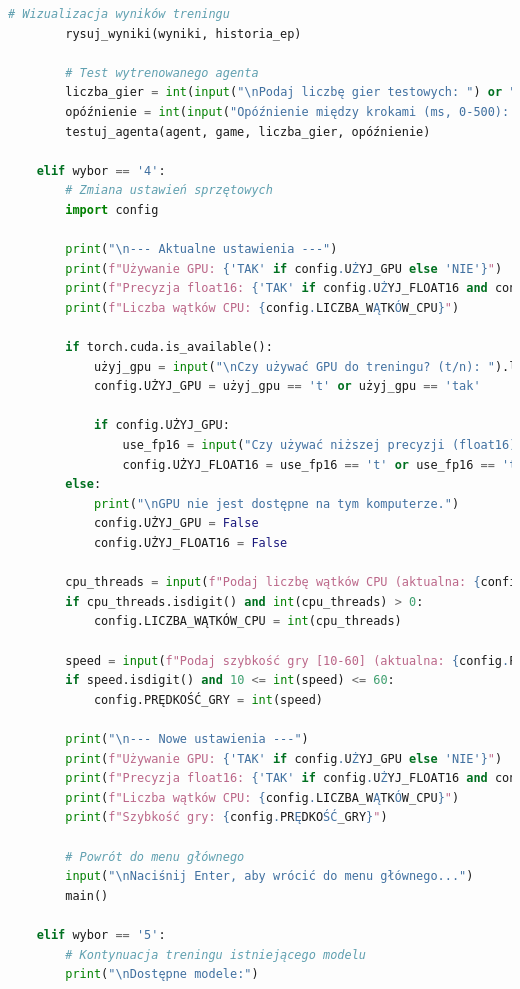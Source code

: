 \documentclass[a4paper,12pt]{article}
\begin{document}
\begin{lstlisting}[language=Python]
        # Wizualizacja wyników treningu
        rysuj_wyniki(wyniki, historia_ep)
        
        # Test wytrenowanego agenta
        liczba_gier = int(input("\nPodaj liczbę gier testowych: ") or "5")
        opóźnienie = int(input("Opóźnienie między krokami (ms, 0-500): ") or "100")
        testuj_agenta(agent, game, liczba_gier, opóźnienie)
    
    elif wybor == '4':
        # Zmiana ustawień sprzętowych
        import config
        
        print("\n--- Aktualne ustawienia ---")
        print(f"Używanie GPU: {'TAK' if config.UŻYJ_GPU else 'NIE'}")
        print(f"Precyzja float16: {'TAK' if config.UŻYJ_FLOAT16 and config.UŻYJ_GPU else 'NIE'}")
        print(f"Liczba wątków CPU: {config.LICZBA_WĄTKÓW_CPU}")
        
        if torch.cuda.is_available():
            użyj_gpu = input("\nCzy używać GPU do treningu? (t/n): ").lower()
            config.UŻYJ_GPU = użyj_gpu == 't' or użyj_gpu == 'tak'
            
            if config.UŻYJ_GPU:
                use_fp16 = input("Czy używać niższej precyzji (float16) dla szybszego treningu? (t/n): ").lower()
                config.UŻYJ_FLOAT16 = use_fp16 == 't' or use_fp16 == 'tak'
        else:
            print("\nGPU nie jest dostępne na tym komputerze.")
            config.UŻYJ_GPU = False
            config.UŻYJ_FLOAT16 = False
        
        cpu_threads = input(f"Podaj liczbę wątków CPU (aktualna: {config.LICZBA_WĄTKÓW_CPU}): ")
        if cpu_threads.isdigit() and int(cpu_threads) > 0:
            config.LICZBA_WĄTKÓW_CPU = int(cpu_threads)
        
        speed = input(f"Podaj szybkość gry [10-60] (aktualna: {config.PRĘDKOŚĆ_GRY}): ")
        if speed.isdigit() and 10 <= int(speed) <= 60:
            config.PRĘDKOŚĆ_GRY = int(speed)
        
        print("\n--- Nowe ustawienia ---")
        print(f"Używanie GPU: {'TAK' if config.UŻYJ_GPU else 'NIE'}")
        print(f"Precyzja float16: {'TAK' if config.UŻYJ_FLOAT16 and config.UŻYJ_GPU else 'NIE'}")
        print(f"Liczba wątków CPU: {config.LICZBA_WĄTKÓW_CPU}")
        print(f"Szybkość gry: {config.PRĘDKOŚĆ_GRY}")
        
        # Powrót do menu głównego
        input("\nNaciśnij Enter, aby wrócić do menu głównego...")
        main()
    
    elif wybor == '5':
        # Kontynuacja treningu istniejącego modelu
        print("\nDostępne modele:")
    

\end{lstlisting}
\end{document}
